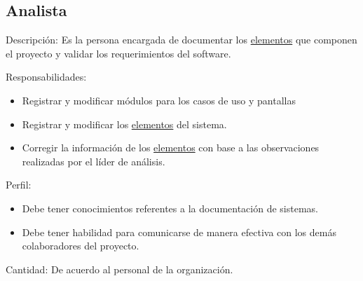 \begin{Usuario}{\hypertarget{analista}{\subsection{Analista}}}{
}
	\item[Descripción:]
	Es la persona encargada de documentar los \hyperlink{tElemento}{elementos} que componen el proyecto y validar los requerimientos del software.
    \item[Responsabilidades:] \cdtEmpty
    \begin{itemize}
		\item Registrar y modificar módulos para los casos de uso y pantallas 
		\item Registrar y modificar los \hyperlink{tElemento}{elementos} del sistema.
		\item Corregir la información de los \hyperlink{tElemento}{elementos} con base a las observaciones realizadas por el líder de análisis.
    \end{itemize}

	\item[Perfil:] \cdtEmpty
    \begin{itemize}
		\item Debe tener conocimientos referentes a la documentación de sistemas.
		\item Debe tener habilidad para comunicarse de manera efectiva con los demás colaboradores del proyecto.
    \end{itemize}
    \item[Cantidad: ]
    De acuerdo al personal de la organización.
\end{Usuario}